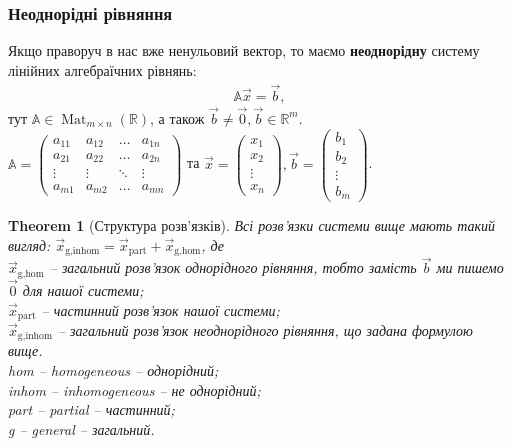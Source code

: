 \documentclass[a4paper, 10pt]{article}
\theoremstyle{theoremdd}
\newtheorem{theorem}{Theorem}[subsection]
\DeclareMathOperator{\Mat}{Mat}
\begin{document}
\subsubsection{Неоднорідні рівняння}
Якщо праворуч в нас вже ненульовий вектор, то маємо \textbf{неоднорідну} систему лінійних алгебраїчних рівнянь:
\begin{align*}
\mathbb{A} \vec{x} = \vec{b},
\end{align*}
тут $\mathbb{A} \in \Mat_{m \times n}(\mathbb{R})$, а також $\vec{b} \neq \vec{0}, \vec{b} \in \mathbb{R}^m$.\\
$\mathbb{A} = \begin{pmatrix}
a_{11} & a_{12} & \dots & a_{1n} \\
a_{21} & a_{22} & \dots & a_{2n} \\
\vdots & \vdots & \ddots & \vdots \\
a_{m1} & a_{m2} & \dots & a_{mn}
\end{pmatrix}$ та $\vec{x} = \begin{pmatrix}
x_1 \\ x_2 \\ \vdots \\ x_n
\end{pmatrix}, \vec{b} = \begin{pmatrix}
b_1 \\ b_2 \\ \vdots \\ b_m
\end{pmatrix}$.

\begin{theorem}[Структура розв'язків]
Всі розв'язки системи вище мають такий вигляд: $\vec{x}_{\text{g,inhom}} = \vec{x}_{\text{part}} + \vec{x}_{\text{g,hom}}$, де \\
$\vec{x}_{\text{g,hom}}$ -- загальний розв'язок однорідного рівняння, тобто замість $\vec{b}$ ми пишемо $\vec{0}$ для нашої системи;\\
$\vec{x}_{\text{part}}$ -- частинний розв'язок нашої системи;\\
$\vec{x}_{\text{g,inhom}}$ -- загальний розв'язок неоднорідного рівняння, що задана формулою вище.
\bigskip \\
hom \textit{-- homogeneous -- однорідний};\\
inhom \textit{-- inhomogeneous -- не однорідний};\\
part \textit{-- partial -- частинний};\\
g \textit{-- general -- загальний}.
\end{theorem}
\end{document}
